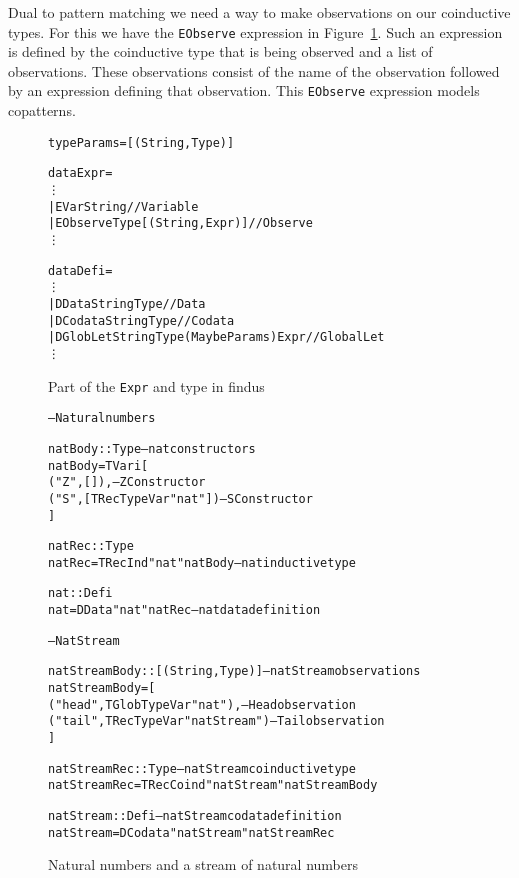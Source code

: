 Dual to pattern matching we need a way to make observations on our coinductive types. For this we have the \texttt{EObserve} expression in Figure~\ref{fig:expr}. Such an expression is defined by the coinductive type that is being observed and a list of observations. These observations consist of the name of the observation followed by an expression defining that observation. This \texttt{EObserve} expression models copatterns.

\begin{figure}
\begin{alltt}
type Params = [(String, Type)]

data Expr =
  \vdots
  | EVar String                              // Variable
  | EObserve Type [(String, Expr)]           // Observe
  \vdots

data Defi =
  \vdots
  | DData String Type                        // Data
  | DCodata String Type                      // Codata
  | DGlobLet String Type (Maybe Params) Expr // Global Let
  \vdots
\end{alltt}
\caption{Part of the \texttt{Expr} and  type in findus}
\label{fig:expr}
\end{figure}
\begin{figure}
\begin{alltt}
-- Natural numbers

natBody :: Type                         -- nat constructors
natBody = TVari [
            ("Z", []),                  -- Z Constructor
            ("S", [TRecTypeVar "nat"])  -- S Constructor
          ]

natRec :: Type
natRec = TRecInd "nat" natBody          -- nat inductive type

nat :: Defi
nat = DData "nat" natRec                -- nat data definition

-- Nat Stream

natStreamBody :: [(String, Type)]          -- natStream observations
natStreamBody = [
                  ("head", TGlobTypeVar "nat"),     -- Head observation
                  ("tail", TRecTypeVar "natStream") -- Tail observation
                ]

natStreamRec :: Type                    -- natStream coinductive type
natStreamRec = TRecCoind "natStream" natStreamBody  

natStream :: Defi                       -- natStream codata definition
natStream = DCodata "natStream" natStreamRec  
\end{alltt}
\caption{Natural numbers and a stream of natural numbers}
\label{fig:natandstream}
\end{figure}

